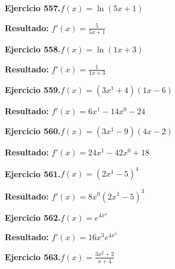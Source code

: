 \documentclass[10pt,a4paper]{article}
\begin{document}
\begin{ejbox}
\textbf{Ejercicio 557.}\quad $f(x) = \ln(5x + 1)$
\end{ejbox}

\begin{solbox}
\textbf{Resultado:} \(\displaystyle f'(x) = \frac{5}{5x + 1}\)
\end{solbox}

\begin{ejbox}
\textbf{Ejercicio 558.}\quad $f(x) = \ln(1x + 3)$
\end{ejbox}

\begin{solbox}
\textbf{Resultado:} \(\displaystyle f'(x) = \frac{1}{1x + 3}\)
\end{solbox}

\newpage
\begin{ejbox}
\textbf{Ejercicio 559.}\quad $f(x) = (3x^{1} +4)(1x -6)$
\end{ejbox}

\begin{solbox}
\textbf{Resultado:} \(\displaystyle f'(x) = 6x^{1} -14x^{0} -24\)
\end{solbox}

\begin{ejbox}
\textbf{Ejercicio 560.}\quad $f(x) = (3x^{1} -9)(4x -2)$
\end{ejbox}

\begin{solbox}
\textbf{Resultado:} \(\displaystyle f'(x) = 24x^{1} -42x^{0} +18\)
\end{solbox}

\begin{ejbox}
\textbf{Ejercicio 561.}\quad $f(x) = (2x^{1} -5)^{4}$
\end{ejbox}

\begin{solbox}
\textbf{Resultado:} \(\displaystyle f'(x) = 8x^{0}(2x^{1} -5)^{3}\)
\end{solbox}

\newpage
\begin{ejbox}
\textbf{Ejercicio 562.}\quad $f(x) = e^{4x^{4}}$
\end{ejbox}

\begin{solbox}
\textbf{Resultado:} \(\displaystyle f'(x) = 16x^{3}e^{4x^{4}}\)
\end{solbox}

\begin{ejbox}
\textbf{Ejercicio 563.}\quad $f(x) = \frac{3x^{2} +2}{x + 4}$
\end{ejbox}
\end{document}
